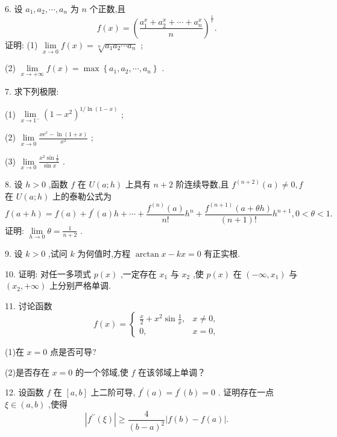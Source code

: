 6. 设 \({a}_{1},{a}_{2},\cdots ,{a}_{n}\) 为 \(n\) 个正数,且
\[
f\left( x\right)  = {\left( \frac{{a}_{1}^{x} + {a}_{2}^{x} + \cdots  + {a}_{n}^{x}}{n}\right) }^{\frac{1}{x}}.
\]
证明: (1) \(\mathop{\lim }\limits_{{x \rightarrow  0}}f\left( x\right)  = \sqrt[n]{{a}_{1}{a}_{2}\cdots {a}_{n}}\) ;

(2) \(\mathop{\lim }\limits_{{x \rightarrow   + \infty }}f\left( x\right)  = \max \left\{  {{a}_{1},{a}_{2},\cdots ,{a}_{n}}\right\}\) .

7. 求下列极限:

(1) \(\mathop{\lim }\limits_{{x \rightarrow  {1}^{ - }}}{\left( 1 - {x}^{2}\right) }^{1/\ln \left( {1 - x}\right) }\) ;

(2) \(\mathop{\lim }\limits_{{x \rightarrow  0}}\frac{x{\mathrm{e}}^{x} - \ln \left( {1 + x}\right) }{{x}^{2}}\) ;

(3) \(\mathop{\lim }\limits_{{x \rightarrow  0}}\frac{{x}^{2}\sin \frac{1}{x}}{\sin x}\) .

8. 设 \(h > 0\) ,函数 \(f\) 在 \(U\left( {a;h}\right)\) 上具有 \(n + 2\) 阶连续导数,且 \({f}^{\left( n + 2\right) }\left( a\right)  \neq  0,f\) 在 \(U\left( {a;h}\right)\) 上的泰勒公式为
\[
f\left( {a + h}\right)  = f\left( a\right)  + {f}^{\prime }\left( a\right) h + \cdots  + \frac{{f}^{\left( n\right) }\left( a\right) }{n!}{h}^{n} + \frac{{f}^{\left( n + 1\right) }\left( {a + {\theta h}}\right) }{\left( {n + 1}\right) !}{h}^{n + 1},0 < \theta  < 1.
\]
证明: \(\mathop{\lim }\limits_{{h \rightarrow  0}}\theta  = \frac{1}{n + 2}\) .

9. 设 \(k > 0\) ,试问 \(k\) 为何值时,方程 \(\arctan x - {kx} = 0\) 有正实根.

10. 证明: 对任一多项式 \(p\left( x\right)\) ,一定存在 \({x}_{1}\) 与 \({x}_{2}\) ,使 \(p\left( x\right)\) 在 \(\left( {-\infty ,{x}_{1}}\right)\) 与 \(\left( {{x}_{2}, + \infty }\right)\) 上分别严格单调.

11. 讨论函数
\[
f\left( x\right)  = \left\{  \begin{array}{ll} \frac{x}{2} + {x}^{2}\sin \frac{1}{x}, & x \neq  0, \\  0, & x = 0, \end{array}\right.
\]

(1)在 \(x = 0\) 点是否可导?

(2)是否存在 \(x = 0\) 的一个邻域,使 \(f\) 在该邻域上单调？

12. 设函数 \(f\) 在 \(\left\lbrack  {a,b}\right\rbrack\) 上二阶可导, \({f}^{\prime }\left( a\right)  = {f}^{\prime }\left( b\right)  = 0\) . 证明存在一点 \(\xi  \in  \left( {a,b}\right)\) ,使得
\[
\left| {{f}^{\prime \prime }\left( \xi \right) }\right|  \geq  \frac{4}{{\left( b - a\right) }^{2}}\left| {f\left( b\right)  - f\left( a\right) }\right| .
\]

